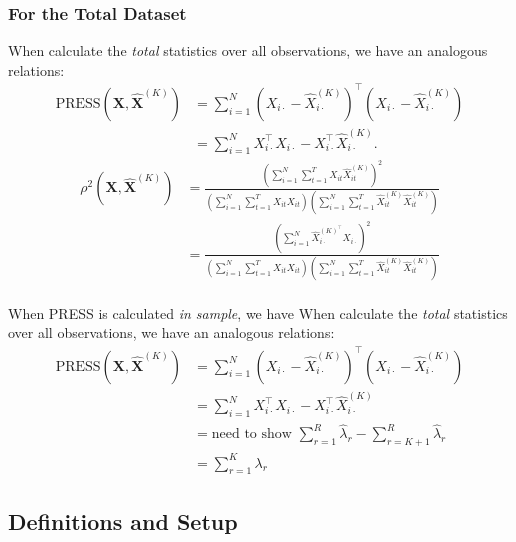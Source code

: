 \subsubsection{For the Total Dataset}

When calculate the \emph{total} statistics over all observations, we have an analogous relations:
\begin{align*}
     \text{PRESS}\left(\mathbf{X}, \widehat{\mathbf{X}}^{(K)}\right) &= \sum_{i=1}^N \left(X_{i\cdot} - \widehat{X}^{(K)}_{i\cdot}\right)^\top \left(X_{i\cdot} - \widehat{X}^{(K)}_{i\cdot}\right) \\
     &= \sum_{i=1}^N X_{i\cdot}^\top X_{i\cdot} - X_{i\cdot}^\top \widehat{X}^{(K)}_{i\cdot}.
\end{align*}
\begin{align*}
    \rho^2\left(\mathbf{X}, \widehat{\mathbf{X}}^{(K)}\right)
    &= \frac{\left(\sum_{i=1}^N \sum_{t=1}^T X_{it} \widehat{X}_{it}^{(K)}\right)^2}{
    \left(\sum_{i=1}^N \sum_{t=1}^T X_{it} X_{it}\right)
    \left(\sum_{i=1}^N \sum_{t=1}^T \widehat{X}_{it}^{(K)} \widehat{X}_{it}^{(K)}\right)
    } \\
    &= 
    \frac{\left(\sum_{i=1}^N \widehat{X}^{(K)^\top}_{i\cdot}X_{i\cdot} \right)^2}{
    \left(\sum_{i=1}^N \sum_{t=1}^T X_{it} X_{it}\right)
    \left(\sum_{i=1}^N \sum_{t=1}^T \widehat{X}_{it}^{(K)} \widehat{X}_{it}^{(K)}\right)
    } \\
\end{align*}

When PRESS is calculated \emph{in sample}, we have
When calculate the \emph{total} statistics over all observations, we have an analogous relations:
\begin{align*}
     \text{PRESS}\left(\mathbf{X}, \widehat{\mathbf{X}}^{(K)}\right) &= \sum_{i=1}^N \left(X_{i\cdot} - \widehat{X}^{(K)}_{i\cdot}\right)^\top \left(X_{i\cdot} - \widehat{X}^{(K)}_{i\cdot}\right) \\
     &= \sum_{i=1}^N X_{i\cdot}^\top X_{i\cdot} - X_{i\cdot}^\top \widehat{X}^{(K)}_{i\cdot} \\
     &= \text{need to show } \sum_{r=1}^R \widehat{\lambda}_r  - \sum_{r=K+1}^R \widehat{\lambda}_r  \\
     &= \sum_{r=1}^K \lambda_r
\end{align*}



\subsection*{Definitions and Setup}

